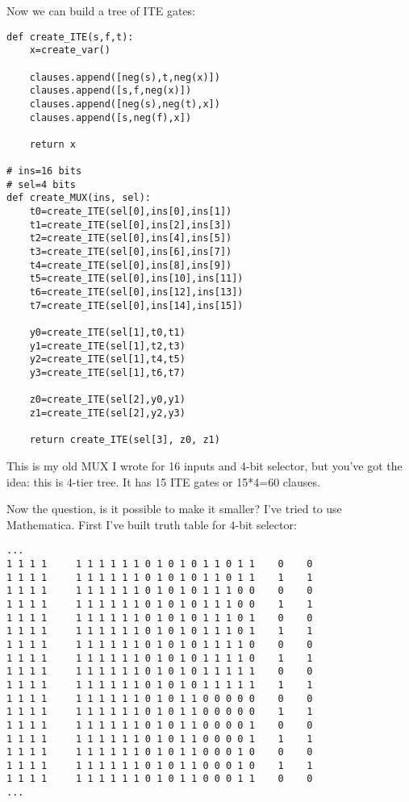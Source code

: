 Now we can build a tree of \ac{ITE} gates:

\begin{lstlisting}
def create_ITE(s,f,t):
    x=create_var()

    clauses.append([neg(s),t,neg(x)])
    clauses.append([s,f,neg(x)])
    clauses.append([neg(s),neg(t),x])
    clauses.append([s,neg(f),x])

    return x

# ins=16 bits
# sel=4 bits
def create_MUX(ins, sel):
    t0=create_ITE(sel[0],ins[0],ins[1])
    t1=create_ITE(sel[0],ins[2],ins[3])
    t2=create_ITE(sel[0],ins[4],ins[5])
    t3=create_ITE(sel[0],ins[6],ins[7])
    t4=create_ITE(sel[0],ins[8],ins[9])
    t5=create_ITE(sel[0],ins[10],ins[11])
    t6=create_ITE(sel[0],ins[12],ins[13])
    t7=create_ITE(sel[0],ins[14],ins[15])

    y0=create_ITE(sel[1],t0,t1)
    y1=create_ITE(sel[1],t2,t3)
    y2=create_ITE(sel[1],t4,t5)
    y3=create_ITE(sel[1],t6,t7)

    z0=create_ITE(sel[2],y0,y1)
    z1=create_ITE(sel[2],y2,y3)

    return create_ITE(sel[3], z0, z1)
\end{lstlisting}

This is my old MUX I wrote for 16 inputs and 4-bit selector, but you've got the idea: this is 4-tier tree.
It has 15 ITE gates or 15*4=60 clauses.

Now the question, is it possible to make it smaller?
I've tried to use Mathematica.
First I've built truth table for 4-bit selector:

\begin{lstlisting}
...
1 1 1 1     1 1 1 1 1 1 0 1 0 1 0 1 1 0 1 1    0    0
1 1 1 1     1 1 1 1 1 1 0 1 0 1 0 1 1 0 1 1    1    1
1 1 1 1     1 1 1 1 1 1 0 1 0 1 0 1 1 1 0 0    0    0
1 1 1 1     1 1 1 1 1 1 0 1 0 1 0 1 1 1 0 0    1    1
1 1 1 1     1 1 1 1 1 1 0 1 0 1 0 1 1 1 0 1    0    0
1 1 1 1     1 1 1 1 1 1 0 1 0 1 0 1 1 1 0 1    1    1
1 1 1 1     1 1 1 1 1 1 0 1 0 1 0 1 1 1 1 0    0    0
1 1 1 1     1 1 1 1 1 1 0 1 0 1 0 1 1 1 1 0    1    1
1 1 1 1     1 1 1 1 1 1 0 1 0 1 0 1 1 1 1 1    0    0
1 1 1 1     1 1 1 1 1 1 0 1 0 1 0 1 1 1 1 1    1    1
1 1 1 1     1 1 1 1 1 1 0 1 0 1 1 0 0 0 0 0    0    0
1 1 1 1     1 1 1 1 1 1 0 1 0 1 1 0 0 0 0 0    1    1
1 1 1 1     1 1 1 1 1 1 0 1 0 1 1 0 0 0 0 1    0    0
1 1 1 1     1 1 1 1 1 1 0 1 0 1 1 0 0 0 0 1    1    1
1 1 1 1     1 1 1 1 1 1 0 1 0 1 1 0 0 0 1 0    0    0
1 1 1 1     1 1 1 1 1 1 0 1 0 1 1 0 0 0 1 0    1    1
1 1 1 1     1 1 1 1 1 1 0 1 0 1 1 0 0 0 1 1    0    0
...
\end{lstlisting}

